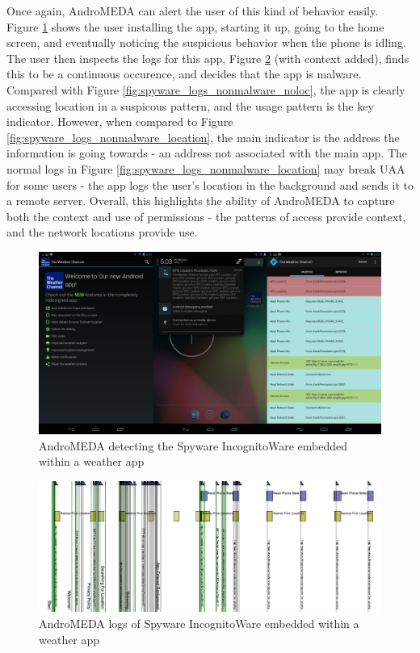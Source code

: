 Once again, AndroMEDA can alert the user of this kind of behavior easily. Figure \ref{fig:spyware_visual} shows the user installing the app, starting it up, going to the home screen, and eventually noticing the suspicious behavior when the phone is idling. The user then inspects the logs for this app, Figure \ref{fig:spyware_logs_malware} (with context added), finds this to be a continuous occurence, and decides that the app is malware. Compared with Figure \ref{fig:spyware_logs_nonmalware_noloc}, the app is clearly accessing location in a suspicous pattern, and the usage pattern is the key indicator. However, when compared to Figure \ref{fig:spyware_logs_nonmalware_location}, the main indicator is the address the information is going towards - an address not associated with the main app. The normal logs in Figure \ref{fig:spyware_logs_nonmalware_location} may break UAA for some users - the app logs the user's location in the background and sends it to a remote server. Overall, this highlights the ability of AndroMEDA to capture both the context and use of permissions - the patterns of access provide context, and the network locations provide use.




\begin{figure}[h]
\begin{center}
\includegraphics[width=1.0\columnwidth]{figs/weather_detection}
\caption{AndroMEDA detecting the Spyware IncognitoWare embedded within a weather app }
\label{fig:spyware_visual}
\end{center}
\end{figure}


\begin{figure}[h]
\begin{center}
\includegraphics[width=1.0\columnwidth]{figs/AndroMEDA_Weather_Malware}
\caption{AndroMEDA logs of Spyware IncognitoWare embedded within a weather app }
\label{fig:spyware_logs_malware}
\end{center}
\end{figure}

